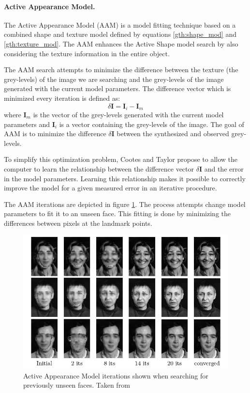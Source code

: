 \documentclass[11pt,a4paper]{report}
\begin{document}
\paragraph{Active Appearance Model.}
The Active Appearance Model (AAM) is a model fitting technique based on a
combined shape and texture model defined by equations \ref{gth:shape_mod} and \ref{gth:texture_mod}. The AAM enhances the Active Shape model search by also considering the texture
information in the entire object.

The AAM search attempts to minimize the difference between the texture (the
grey-levels) of the image we are searching and the grey-levels of the
image generated with the current model parameters. The difference vector which
 is minimized every iteration is defined as:
\begin{equation}
\delta \mathbf{I} = \mathbf{I}_i - \mathbf{I}_m
\end{equation}
where $\mathbf{I}_m$ is the vector of the grey-levels generated with the current model
parameters and $\mathbf{I}_i$ is a vector containing the grey-levels of the
image. The goal of AAM is to minimize the difference $\delta \mathbf{I}$ between
the synthesized and observed grey-levels.

To simplify this optimization problem, Cootes and Taylor propose to allow the
computer to learn the relationship
between the difference vector $\delta \mathbf{I}$ and the error in the model
parameters. Learning this relationship makes it possible to correctly improve the
model for a given measured error in an iterative procedure.

The AAM iterations are depicted in figure \ref{gr:amm}. The process attempts
change model parameters to fit it to an unseen face. This fitting is done by
minimizing the differences between pixels at the landmark points.

\begin{figure}[H]

\includegraphics[scale=0.7]{images/amm_example.png}
\caption{ Active Appearance Model iterations shown when searching for previously
 unseen faces. Taken from \cite{activeApp04} }
\label{gr:amm}
\end{figure}
\end{document}

